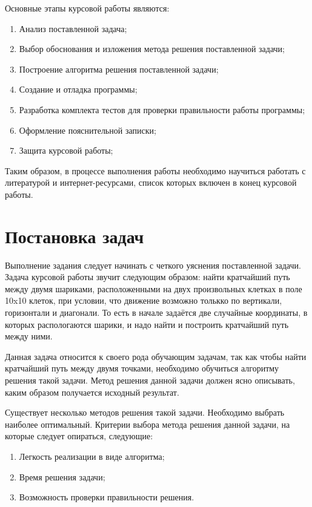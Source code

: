 \documentclass[chapterprefix=true,headings=onelineappendix]{scrartcl}
\begin{document}
Основные этапы курсовой работы являются:
\begin{enumerate}
	\item Анализ поставленной задача;
	\item Выбор обоснования и изложения метода решения поставленной
	     задачи;
	\item Построение алгоритма решения поставленной задачи;
	\item Создание и отладка программы;
	\item Разработка комплекта тестов для проверки правильности работы
	     программы;
	\item Оформление пояснительной записки;
	\item Защита курсовой работы;
\end{enumerate}

Таким образом, в процессе выполнения работы необходимо научиться
работать с литературой и интернет-ресурсами, список которых включен в
конец курсовой работы.

\newpage{}
\section{Постановка задач}

Выполнение задания следует начинать с четкого уяснения поставленной
задачи. Задача курсовой работы звучит следующим образом: найти
кратчайший путь между двумя шариками, расположенными на двух
произвольных клетках в поле 10x10 клеток, при условии, что движение
возможно толькко по вертикали, горизонтали и диагонали. То есть в
начале задаётся две случайные координаты, в которых распологаются
шарики, и надо найти и построить кратчайший путь между ними.

Данная задача относится к своего рода обучающим задачам, так как чтобы
найти кратчайший путь между двумя точками, необходимо обучиться
алгоритму решения такой задачи. Метод решения данной задачи должен
ясно описывать, каким образом получается исходный результат.

Существует несколько методов решения такой задачи. Необходимо выбрать
наиболее оптимальный. Критерии выбора метода решения данной задачи, на
которые следует опираться, следующие:
\begin{enumerate}
	\item Легкость реализации в виде алгоритма;
	\item Время решения задачи;
	\item Возможность проверки правильности решения.
\end{enumerate}
\end{document}
